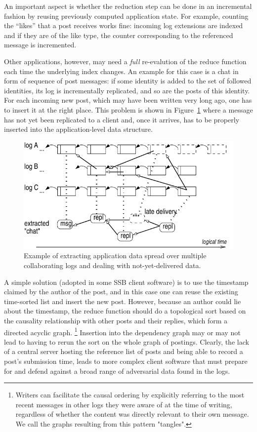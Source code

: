 \documentclass[9pt,sigconf]{acmart}
\begin{document}
An important aspect is whether the reduction step can be done in an
incremental fashion by reusing previously computed application state.
For example, counting the ``likes'' that a post receives works fine:
incoming log extensions are indexed and if they are of the like type,
the counter corresponding to the referenced message is incremented.

Other applications, however, may need a {\em full} re-evalution of the
reduce function each time the underlying index changes. An example for
this case is a chat in form of sequence of post messages: if some identity is added to
the set of followed identities, its log is incrementally replicated, and
so are the posts of this identity. For each incoming new post, which may
have been written very long ago, one has to insert it at the right
place. This problem is shown in Figure~\ref{fig:tangle} where a message
has not yet been replicated to a client and, once it arrives,
has to be properly inserted into the application-level data structure.

\begin{figure}[htb]
  \includegraphics[width=0.9\columnwidth]{figs/tangle.pdf}
  \caption{Example of extracting application data spread over multiple collaborating logs and dealing
    with not-yet-delivered data.\label{fig:tangle}}
\end{figure}

A simple solution (adopted in some SSB client software) is to use the
timestamp claimed by the author of the post, and in this case one can
reuse the existing time-sorted list and insert the new post. However,
because an author could lie about the timestamp, the reduce function
should do a topological sort  based on the causality relationship with
other posts and their replies, which form a directed acyclic graph.
\footnote{Writers can facilitate the causal ordering by explicitly referring to the most recent messages in other logs they were aware of at the time of writing, regardless of whether the content was directly relevant to their own message. We call the graphs resulting from this pattern "tangles".} Insertion into the dependency graph may or may not lead to having to rerun the sort on the whole graph of
postings. Clearly, the lack of a central server hosting the reference
list of posts and being able to record a post's submission time, leads
to more complex client software that must prepare for and defend
against a broad range of adversarial data found in the logs.
\end{document}
